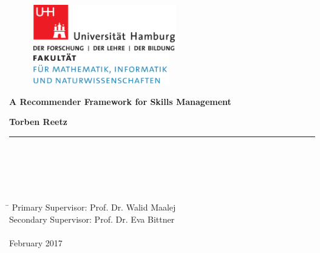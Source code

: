 \begin{titlepage}

  \setcounter{page}{-1}

	\begin{figure}[h]
		\begin{minipage}[b]{62mm}
			\includegraphics[width=62mm]{images/unilogo}
		\end{minipage}
		\hspace{4cm}
		\begin{minipage}[b]{59mm}
			\includegraphics[width=59mm]{images/minlogo}
		\end{minipage}
	\end{figure}

	\vfill

	\begin{center}
		\vspace{14mm}
		\noindent \textbf{\huge
		A Recommender Framework for Skills Management \\
		}
		\vspace{14mm}
	\end{center}

	\vfill

	\noindent \textbf{Torben Reetz} \\
	\noindent \rule{\textwidth}{0.4mm}
	 \\
	 \\
	 \\
	 \\
	\begin{tabbing}
	\hspace{8em} \=  \kill
	Primary Supervisor: Prof. Dr. Walid Maalej \\
	Secondary Supervisor: Prof. Dr. Eva Bittner \\
	~ \\
	February 2017
	\end{tabbing}


\end{titlepage}
